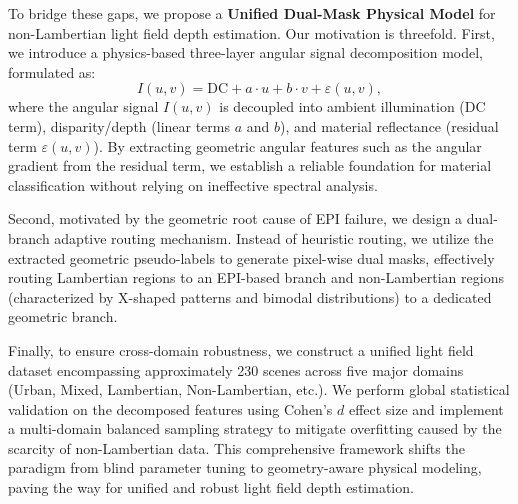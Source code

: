 To bridge these gaps, we propose a \textbf{Unified Dual-Mask Physical Model} for non-Lambertian light field depth estimation. Our motivation is threefold. First, we introduce a physics-based three-layer angular signal decomposition model, formulated as:
\begin{equation}
    I(u,v) = \text{DC} + a \cdot u + b \cdot v + \varepsilon(u,v),
    \label{eq:ch2_1}
\end{equation}
where the angular signal $I(u,v)$ is decoupled into ambient illumination (DC term), disparity/depth (linear terms $a$ and $b$), and material reflectance (residual term $\varepsilon(u,v)$). By extracting geometric angular features such as the angular gradient from the residual term, we establish a reliable foundation for material classification without relying on ineffective spectral analysis.

Second, motivated by the geometric root cause of EPI failure, we design a dual-branch adaptive routing mechanism. Instead of heuristic routing, we utilize the extracted geometric pseudo-labels to generate pixel-wise dual masks, effectively routing Lambertian regions to an EPI-based branch and non-Lambertian regions (characterized by X-shaped patterns and bimodal distributions) to a dedicated geometric branch. 

Finally, to ensure cross-domain robustness, we construct a unified light field dataset encompassing approximately 230 scenes across five major domains (Urban, Mixed, Lambertian, Non-Lambertian, etc.). We perform global statistical validation on the decomposed features using Cohen's $d$ effect size and implement a multi-domain balanced sampling strategy to mitigate overfitting caused by the scarcity of non-Lambertian data. This comprehensive framework shifts the paradigm from blind parameter tuning to geometry-aware physical modeling, paving the way for unified and robust light field depth estimation.